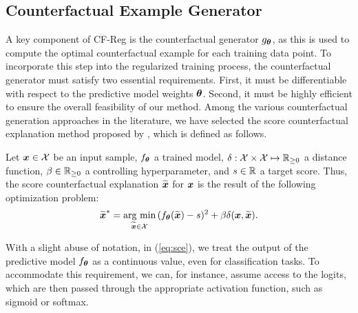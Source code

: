 \subsection{Counterfactual Example Generator}
A key component of CF-Reg is the counterfactual generator $g_{\boldsymbol{\theta}}$, as this is used to compute the optimal counterfactual example for each training data point.
To incorporate this step into the regularized training process, the counterfactual generator must satisfy two essential requirements. First, it must be differentiable with respect to the predictive model weights $\boldsymbol{\theta}$. Second, it must be highly efficient to ensure the overall feasibility of our method. Among the various counterfactual generation approaches in the literature, we have selected the score counterfactual explanation method proposed by \cite{wachter2017hjlt}, which is defined as follows.
\begin{definition} Let $\boldsymbol{x} \in \mathcal{X}$ be an input sample, $f_{\boldsymbol{\theta}}$ a trained model, $\delta:\mathcal{X}\times \mathcal{X} \mapsto \mathbb{R}_{\geq 0}$ a distance function, $\beta \in \mathbb{R}_{\geq 0}$ a controlling hyperparameter, and $s \in \mathbb{R}$ a target score. Thus, the score counterfactual explanation $\widetilde{\boldsymbol{x}}$ for $\boldsymbol{x}$ is the result of the following optimization problem: 
\begin{equation}
\label{eq:sce}
        \widetilde{\boldsymbol{x}}^* = \underset{\widetilde{\boldsymbol{x}} \in \mathcal{X}}{\text{arg min}} \, (f_{\boldsymbol{\theta}}(\widetilde{\boldsymbol{x}}) - s)^2 + \beta \delta(\boldsymbol{x}, \widetilde{\boldsymbol{x}}).
    \end{equation}
\end{definition}

With a slight abuse of notation, in (\ref{eq:sce}), we treat the output of the predictive model $f_{\boldsymbol{\theta}}$ as a continuous value, even for classification tasks. 
To accommodate this requirement, we can, for instance, assume access to the logits, which are then passed through the appropriate activation function, such as sigmoid or softmax.

